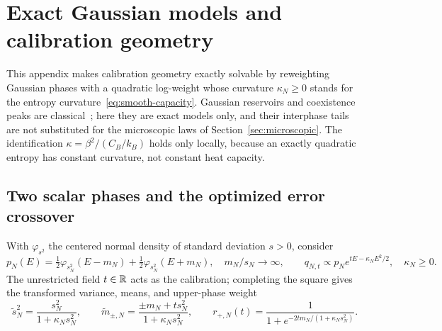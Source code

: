 \section{Exact Gaussian models and calibration geometry}
\label{sec:gaussian-geometry}

This appendix makes calibration geometry exactly solvable by
reweighting Gaussian phases with a quadratic log-weight whose
curvature $\kappa_N\ge0$ stands for the entropy
curvature~\eqref{eq:smooth-capacity}. Gaussian reservoirs and
coexistence peaks are
classical~\cite{ChallaHetherington1988PRL,ChallaLandauBinder1986};
here they are exact models only, and their interphase tails are not
substituted for the microscopic laws of Section~\ref{sec:microscopic}.
The identification $\kappa=\beta^2/(C_B/k_B)$ holds only locally,
because an exactly quadratic entropy has constant curvature, not
constant heat capacity.

\subsection{Two scalar phases and the optimized error crossover}

With $\varphi_{s^2}$ the centered normal density of standard
deviation $s>0$, consider
\begin{equation}
 p_N(E)=\tfrac12\varphi_{s_N^2}(E-m_N)+\tfrac12\varphi_{s_N^2}(E+m_N),
 \quad m_N/s_N\to\infty,
 \qquad
 q_{N,t}\propto p_N e^{tE-\kappa_NE^2/2},\quad\kappa_N\ge0.
 \label{eq:scalar-gaussian-model}
\end{equation}
The unrestricted field $t\in\mathbb R$ acts as the calibration;
completing the square gives the transformed variance, means, and
upper-phase weight
\begin{equation}
 \widetilde s_N^2=\frac{s_N^2}{1+\kappa_Ns_N^2},\qquad
 \widetilde m_{\pm,N}=\frac{\pm m_N+t s_N^2}{1+\kappa_Ns_N^2},\qquad
 r_{+,N}(t)=\frac1{1+e^{-2tm_N/(1+\kappa_Ns_N^2)}}.
 \label{eq:scalar-gaussian-completion}
\end{equation}

